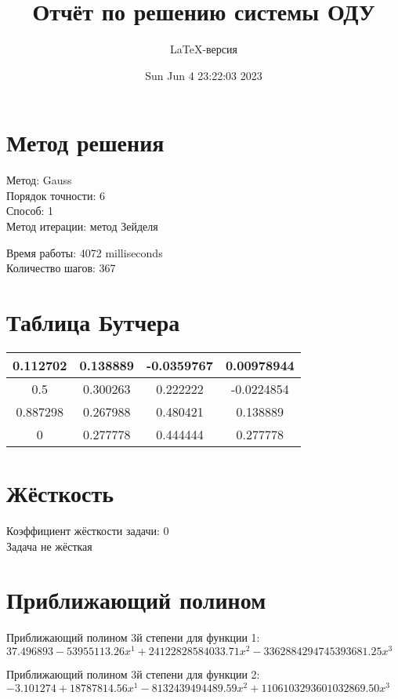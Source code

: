 \documentclass[a4paper,14pt]{extarticle}
\title{Отчёт по решению системы ОДУ}
\author{LaTeX-версия}
\date{Sun Jun  4 23:22:03 2023}
\begin{document}
\maketitle

\tableofcontents
\pagebreak

\section{Метод решения}

Метод: Gauss\\
Порядок точности: 6\\
Способ: 1\\
Метод итерации: метод Зейделя

Время работы: 4072 milliseconds\\
Количество шагов: 367\\
\section{Таблица Бутчера}

\begin{table}[h]
\centering
\begin{tabular}{|c||c|c|c|}
\hline
0.112702 & 0.138889 & -0.0359767 & 0.00978944\\
\hline
0.5 & 0.300263 & 0.222222 & -0.0224854\\
\hline
0.887298 & 0.267988 & 0.480421 & 0.138889\\
\hline
0 & \cellcolor{lightgray} 0.277778 & \cellcolor{lightgray} 0.444444 & \cellcolor{lightgray} 0.277778\\
\hline
\end{tabular}
\end{table}

\section{Жёсткость}

Коэффициент жёсткости задачи: 0\\
Задача не жёсткая

\section{Приближающий полином}

Приближающий полином 3й степени для функции 1: $37.496893 - 53955113.26x^1 + 24122828584033.71x^2 - 3362884294745393681.25x^3$

Приближающий полином 3й степени для функции 2: $-3.101274 + 18787814.56x^1 - 8132439494489.59x^2 + 1106103293601032869.50x^3$
\end{document}
